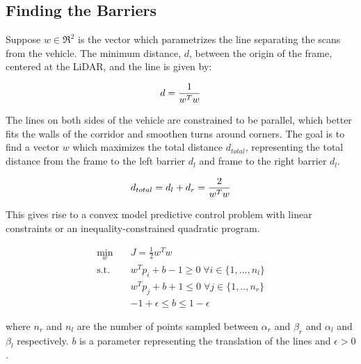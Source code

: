 \documentclass[conference]{IEEEtran}
\begin{document}
\subsection{Finding the Barriers}
Suppose $w \in \Re^2$  is the vector which parametrizes the line separating the scans from the vehicle. The minimum distance, $d$, between the origin of the frame, centered at the LiDAR, and the line is given by:

\begin{align}
    d = \frac{1}{w^T w} \notag
\end{align}

The lines on both sides of the vehicle are constrained to be parallel, which better fits the walls of the corridor and smoothen turns around corners. The goal is to find a vector $w$ which maximizes the total distance $d_{total}$, representing the total distance from the frame to the left barrier $d_l$ and frame to the right barrier $d_l$. 

\begin{align}
    d_{total} = d_l + d_r = \frac{2}{w^T w} \notag
\end{align}


This gives rise to a convex model predictive control problem with linear constraints or an inequality-constrained quadratic program.  

\begin{equation}
\begin{aligned}
        \min_{w}  \quad & J = \frac{1}{2}w^T w \\
        \text{s.t.} \quad & w^Tp_i + b - 1 \geq 0  \; \forall i \in \{1,...,n_l\} \\
        & w^Tp_j + b + 1 \leq 0 \; \forall j \in \{1,..,n_r\}\\ 
        & -1+\epsilon \leq b \leq 1 - \epsilon
\end{aligned}
\end{equation}


where $n_r$ and $n_l$ are the number of points sampled between $\alpha_r$ and $\beta_r$ and $\alpha_l$ and $\beta_l$ respectively. $b$ is a parameter representing the translation of the lines and $\epsilon > 0$.

\end{document}
